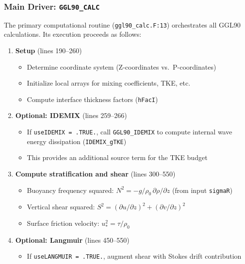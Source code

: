 \documentclass[12pt,letterpaper]{article}
\begin{document}
\subsubsection{Main Driver: \texttt{GGL90\_CALC}}

The primary computational routine (\texttt{ggl90\_calc.F:13}) orchestrates all
GGL90 calculations. Its execution proceeds as follows:

\begin{enumerate}[leftmargin=*, label=\textbf{Step \arabic*.}]
  \item \textbf{Setup} (lines 190--260)
    \begin{itemize}[label=$\circ$]
      \item Determine coordinate system (Z-coordinates vs.\ P-coordinates)
      \item Initialize local arrays for mixing coefficients, TKE, etc.
      \item Compute interface thickness factors (\texttt{hFacI})
    \end{itemize}

  \item \textbf{Optional: IDEMIX} (lines 259--266)
    \begin{itemize}[label=$\circ$]
      \item If \texttt{useIDEMIX = .TRUE.}, call \texttt{GGL90\_IDEMIX} to
            compute internal wave energy dissipation (\texttt{IDEMIX\_gTKE})
      \item This provides an additional source term for the TKE budget
    \end{itemize}

  \item \textbf{Compute stratification and shear} (lines 300--550)
    \begin{itemize}[label=$\circ$]
      \item Buoyancy frequency squared: $N^2 = -g/\rho_0 \, \partial\rho/\partial z$
            (from input \texttt{sigmaR})
      \item Vertical shear squared: $S^2 = (\partial u/\partial z)^2 + (\partial v/\partial z)^2$
      \item Surface friction velocity: $u_*^2 = \tau/\rho_0$
    \end{itemize}

  \item \textbf{Optional: Langmuir} (lines 450--550)
    \begin{itemize}[label=$\circ$]
      \item If \texttt{useLANGMUIR = .TRUE.}, augment shear with Stokes drift
            contribution
    \end{itemize}


\end{enumerate}
\end{document}
